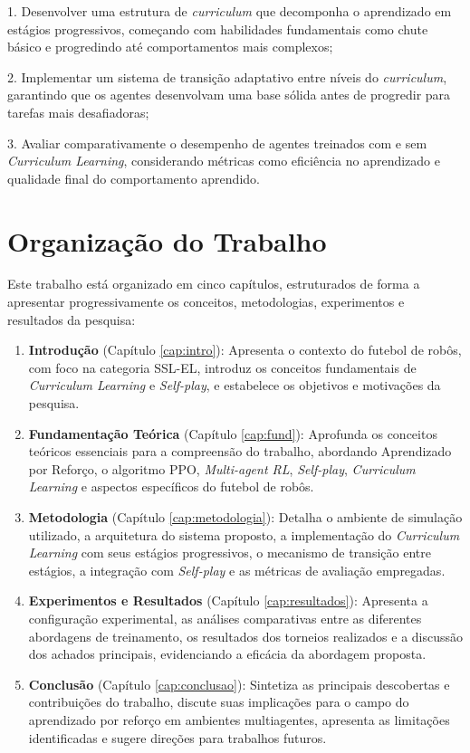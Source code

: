 1. Desenvolver uma estrutura de \textit{curriculum} que decomponha o aprendizado em estágios progressivos, começando com habilidades fundamentais como chute básico e progredindo até comportamentos mais complexos;

2. Implementar um sistema de transição adaptativo entre níveis do \textit{curriculum}, garantindo que os agentes desenvolvam uma base sólida antes de progredir para tarefas mais desafiadoras;

3. Avaliar comparativamente o desempenho de agentes treinados com e sem \textit{Curriculum Learning}, considerando métricas como eficiência no aprendizado e qualidade final do comportamento aprendido.

\section{Organização do Trabalho}
\label{sec:organizacao}

Este trabalho está organizado em cinco capítulos, estruturados de forma a apresentar progressivamente os conceitos, metodologias, experimentos e resultados da pesquisa:

\begin{enumerate}
    \item \textbf{Introdução} (Capítulo \ref{cap:intro}): Apresenta o contexto do futebol de robôs, com foco na categoria SSL-EL, introduz os conceitos fundamentais de \textit{Curriculum Learning} e \textit{Self-play}, e estabelece os objetivos e motivações da pesquisa.
    
    \item \textbf{Fundamentação Teórica} (Capítulo \ref{cap:fund}): Aprofunda os conceitos teóricos essenciais para a compreensão do trabalho, abordando Aprendizado por Reforço, o algoritmo PPO, \textit{Multi-agent RL}, \textit{Self-play}, \textit{Curriculum Learning} e aspectos específicos do futebol de robôs.
    
    \item \textbf{Metodologia} (Capítulo \ref{cap:metodologia}): Detalha o ambiente de simulação utilizado, a arquitetura do sistema proposto, a implementação do \textit{Curriculum Learning} com seus estágios progressivos, o mecanismo de transição entre estágios, a integração com \textit{Self-play} e as métricas de avaliação empregadas.
    
    \item \textbf{Experimentos e Resultados} (Capítulo \ref{cap:resultados}): Apresenta a configuração experimental, as análises comparativas entre as diferentes abordagens de treinamento, os resultados dos torneios realizados e a discussão dos achados principais, evidenciando a eficácia da abordagem proposta.
    
    \item \textbf{Conclusão} (Capítulo \ref{cap:conclusao}): Sintetiza as principais descobertas e contribuições do trabalho, discute suas implicações para o campo do aprendizado por reforço em ambientes multiagentes, apresenta as limitações identificadas e sugere direções para trabalhos futuros.
\end{enumerate}

